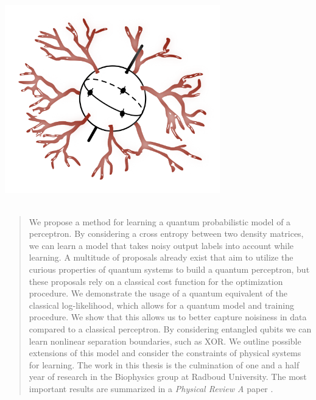 \documentclass[
11pt, %
english, %
singlespacing, %
headsepline, %
]{stylesheet/MastersDoctoralThesis} %
\theoremstyle{plain}
\begin{document}
\begin{titlepage}
\begin{center}
\begin{minipage}[t]{0.4\textwidth}
\begin{flushright}
\end{flushright}
\end{minipage}\\[1cm]
\includegraphics[width=0.7\textwidth]{figures/title_page/title_page_full.png} \\[2cm]
\deptname\\[2cm] %
 
\vfill

\vfill
\end{center}
\end{titlepage}


\begin{abstract}
We propose a method for learning a quantum probabilistic model of a perceptron. By considering a cross entropy between two density matrices, we can learn a model that takes noisy output labels into account while learning. A multitude of proposals already exist that aim to utilize the curious properties of quantum systems to build a quantum perceptron, but these proposals rely on a classical cost function for the optimization procedure. We demonstrate the usage of a quantum equivalent of the classical log-likelihood, which allows for a quantum model and training procedure. We show that this allows us to better capture noisiness in data compared to a classical perceptron. By considering entangled qubits we can learn nonlinear separation boundaries, such as XOR. We outline possible extensions of this model and consider the constraints of physical systems for learning. The work in this thesis is the culmination of one and a half year of research in the Biophysics group at Radboud University. The most important results are summarized in a \textit{Physical Review A} paper \cite{Wiersema2019}.
\end{abstract}
\end{document}
